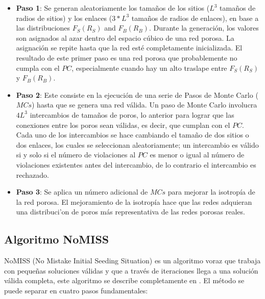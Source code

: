 \begin{itemize}
\item[] \textbf{Paso 1}:
Se generan aleatoriamente los tamaños de los sitios 
($L^3$ tamaños de radios de sitios) y los enlaces ($3*L^3$ tamaños de radios de enlaces), en base a las 
distribuciones $F_S(R_S)$ and $F_B(R_B)$. Durante la generación, los valores 
son asignados al azar dentro del espacio c\'ubico de una red porosa.
La asignación se repite hasta que la red est\'e completamente inicializada. El resultado de este primer paso es una red porosa que 
probablemente no cumpla con el $PC$, especialmente cuando hay un alto traslape entre $F_S(R_S)$ y $F_B(R_B)$.\\
\item[] \textbf{Paso 2}:
Este consiste en la ejecución de una serie de Pasos de Monte Carlo ($MCs$) hasta que se genera una red válida. 
Un paso de Monte Carlo involucra $4L^3$ intercambios de tamaños de poros, lo anterior para lograr que las 
conexiones entre los poros sean válidas, es decir, que cumplan con el $PC$. Cada uno de los intercambios se hace cambiando el tamaño de 
dos sitios o dos enlaces, los cuales se seleccionan aleatoriamente; un intercambio es válido si y solo si el número de violaciones al 
$PC$ es menor o igual al número de violaciones existentes antes del intercambio, de lo contrario el intercambio es rechazado.\\
\item[] \textbf{Paso 3}:
Se aplica un n\'umero adicional de $MCs$ para mejorar la isotrop\'ia de la red porosa. El mejoramiento de la isotrop\'ia 
hace que las redes adquieran una distribuci'on de poros m\'as representativa de las redes porosas reales.  
\end{itemize}


\subsection{Algoritmo NoMISS}
\label{subsubsec:nomiss}
NoMISS (No Mistake Initial Seeding Situation) es un algoritmo voraz que trabaja con pequeñas soluciones válidas y que a través de 
iteraciones llega a una solución válida completa, este algoritmo se describe completamente en \cite{ref3}. El método se puede separar
en cuatro pasos fundamentales:

